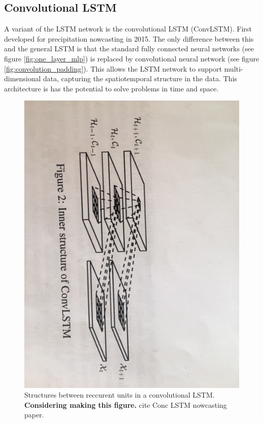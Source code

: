 \documentclass{article}
\begin{document}
\subsection{Convolutional LSTM}  \label{sec:convolutional_lstm}
A variant of the LSTM network is the convolutional LSTM (ConvLSTM). First developed for precipitation nowcasting in 2015. The only difference between this and the general LSTM is that the standard fully connected neural networks (see figure \ref{fig:one_layer_mlp}) is replaced by convolutional neural network (see figure \ref{fig:convolution_padding}). This allows the LSTM network to support multi-dimensional data, capturing the spatiotemporal structure in the data. This architecture is has the potential to solve problems in time and space. 
\begin{figure}
    \centering
    \includegraphics[scale = 0.5]{convLSTM_inside_structure.JPG}
    \caption{Structures between reccurent units in a convolutional LSTM. \textbf{Considering making this figure.} cite Conc LSTM nowcasting paper.}
    \label{fig:inside_convLSTM}
\end{figure}
\end{document}
